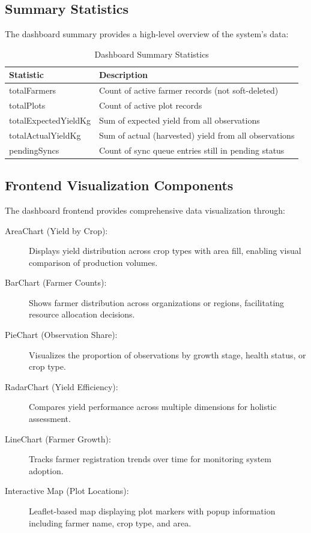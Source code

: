 \subsection{Summary Statistics}

The dashboard summary provides a high-level overview of the system's data:

\begin{table}[H]
\centering
\caption{Dashboard Summary Statistics}
\label{tab:dashboard-summary}
\begin{tabularx}{\textwidth}{lX}
\toprule
\textbf{Statistic} & \textbf{Description} \\
\midrule
totalFarmers & Count of active farmer records (not soft-deleted) \\
totalPlots & Count of active plot records \\
totalExpectedYieldKg & Sum of expected yield from all observations \\
totalActualYieldKg & Sum of actual (harvested) yield from all observations \\
pendingSyncs & Count of sync queue entries still in pending status \\
\bottomrule
\end{tabularx}
\end{table}

\subsection{Frontend Visualization Components}

The dashboard frontend provides comprehensive data visualization through:

\begin{description}
  \item[AreaChart (Yield by Crop):] Displays yield distribution across crop types with area fill, enabling visual comparison of production volumes.
  \item[BarChart (Farmer Counts):] Shows farmer distribution across organizations or regions, facilitating resource allocation decisions.
  \item[PieChart (Observation Share):] Visualizes the proportion of observations by growth stage, health status, or crop type.
  \item[RadarChart (Yield Efficiency):] Compares yield performance across multiple dimensions for holistic assessment.
  \item[LineChart (Farmer Growth):] Tracks farmer registration trends over time for monitoring system adoption.
  \item[Interactive Map (Plot Locations):] Leaflet-based map displaying plot markers with popup information including farmer name, crop type, and area.
\end{description}

